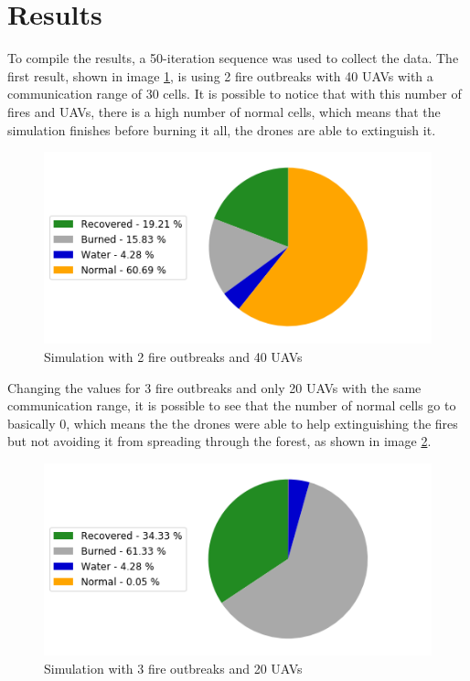 \documentclass{article}
\begin{document}
\section{Results}
To compile the results, a 50-iteration sequence was used to collect the data. The first result, shown in image \ref{fig:fig2}, is using 2 fire outbreaks with 40 UAVs with a communication range of 30 cells. It is possible to notice that with this number of fires and UAVs, there is a high number of normal cells, which means that the simulation finishes before burning it all, the drones are able to extinguish it.

\begin{figure}[!ht]
\centering
\includegraphics[scale=0.6]{fires_2_uavs_40_range_30}
\caption{Simulation with 2 fire outbreaks and 40 UAVs}
\label{fig:fig2}
\end{figure}

Changing the values for 3 fire outbreaks and only 20 UAVs with the same communication range, it is possible to see that the number of normal cells go to basically 0, which means the the drones were able to help extinguishing the fires but not avoiding it from spreading through the forest, as shown in image \ref{fig:fig3}.

\begin{figure}[!ht]
\centering
\includegraphics[scale=0.6]{fires_3_uavs_20_range_30}
\caption{Simulation with 3 fire outbreaks and 20 UAVs}
\label{fig:fig3}
\end{figure}
\end{document}
